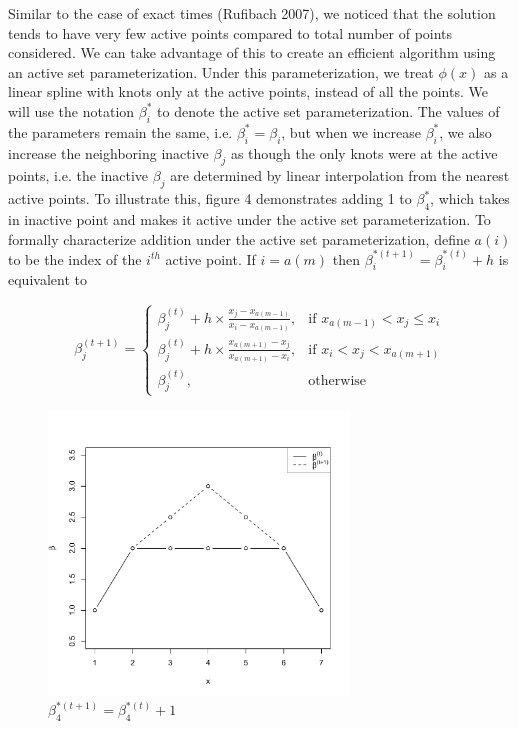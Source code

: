 \documentclass[12pt]{article}
\numberwithin{equation}{section}
\begin{document}
	Similar to the case of exact times (Rufibach 2007), we noticed that the solution tends to have very few active points compared to total number of points considered. We can take advantage of this to create an efficient algorithm using an active set parameterization. Under this parameterization, we treat $\phi(x)$ as a linear spline with knots only at the active points, instead of all the points. We will use the notation $\beta_i^*$ to denote the active set parameterization. The values of the parameters remain the same, i.e. $\beta_i^* = \beta_i$, but when we increase $\beta_i^*$, we also increase the neighboring inactive $\beta_j$ as though the only knots were at the active points, i.e. the inactive $\beta_j$ are determined by linear interpolation from the nearest active points. To illustrate this, figure 4 demonstrates adding 1 to $\beta_4^*$, which takes in inactive point and makes it active under the active set parameterization. To formally characterize addition under the active set parameterization, define $a(i)$ to be the index of the $i^{th}$ active point. If $i = a(m)$ then $\beta_i^{*(t+1)} = \beta_i^{*(t)} + h$ is equivalent to 
		
	\[
	\beta^{(t+1)}_j = 
	\begin{cases}
		\beta^{(t)}_j + h \times \frac{x_j - x_{a(m-1)} } {x_{i} - x_{a(m-1)} } , & \text{if } x_{a(m-1)} < x_j  \leq x_{i} \\ 
		\beta^{(t)}_j + h \times \frac{x_{a(m+1)} - x_j} {x_{a(m+1)} - x_{i} }, & \text{if } x_{ i} < x_j < x_{a(m+1)} \\ 
		\beta^{(t)}_j, & \text{otherwise}
	\end{cases}
	\]

	
\begin{figure}[h]
\centerline{\includegraphics[width = 8cm]{ActivePoint.pdf}}
\caption{$\beta_4^{*(t+1)} = \beta_4^{*(t) }+1$}
\end{figure}		
		
\end{document}
